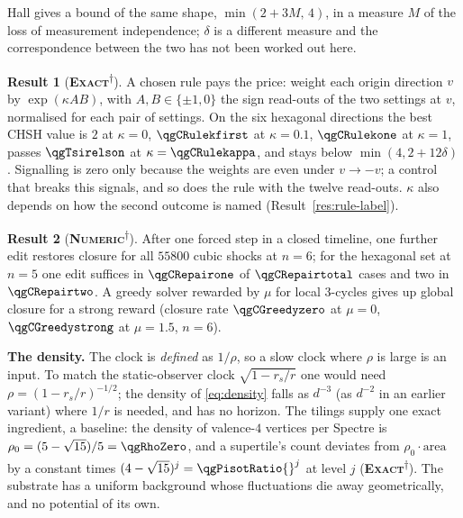 \documentclass[11pt]{article}
\newcommand{\exact}{\textbf{\textsc{Exact}}}
\newcommand{\numeric}{\textbf{\textsc{Numeric}}}
\newcommand{\snap}{\textsuperscript{$\dagger$}}      %
\theoremstyle{definition}
\newtheorem{result}{Result}
\begin{document}
Hall \cite{hall2010} gives a bound of the same shape, $\min(2+3M,\,4)$, in a measure $M$ of the loss of measurement independence; $\delta$ is a different measure and the correspondence between the two has not been worked out here.
\begin{result}[\exact\snap]\label{res:rule}
A chosen rule pays the price: weight each origin direction $v$ by $\exp(\kappa AB)$, with $A,B\in\{\pm1,0\}$ the sign read-outs of the two settings at $v$, normalised for each pair of settings. On the six hexagonal directions the best CHSH value is $2$ at $\kappa=0$, $\qgCRulekfirst$ at $\kappa=0.1$, $\qgCRulekone$ at $\kappa=1$, passes $\qgTsirelson$ at $\kappa=\qgCRulekappa$, and stays below $\min(4,2+12\delta)$. Signalling is zero only because the weights are even under $v\to-v$; a control that breaks this signals, and so does the rule with the twelve read-outs. $\kappa$ also depends on how the second outcome is named (Result~\ref{res:rule-label}).
\end{result}
\begin{result}[\numeric\snap]\label{res:repair}
After one forced step in a closed timeline, one further edit restores closure for all $55800$ cubic shocks at $n=6$; for the hexagonal set at $n=5$ one edit suffices in $\qgCRepairone$ of $\qgCRepairtotal$ cases and two in $\qgCRepairtwo$. A greedy solver rewarded by $\mu$ for local $3$-cycles gives up global closure for a strong reward (closure rate $\qgCGreedyzero$ at $\mu=0$, $\qgCGreedystrong$ at $\mu=1.5$, $n=6$).
\end{result}
\textbf{The density.}\label{sec:density}\label{sec:density-limits} The clock is \emph{defined} as $1/\rho$, so a slow clock where $\rho$ is large is an input. To match the static-observer clock $\sqrt{1-r_s/r}$ one would need $\rho=(1-r_s/r)^{-1/2}$; the density of \eqref{eq:density} falls as $d^{-3}$ (as $d^{-2}$ in an earlier variant) where $1/r$ is needed, and has no horizon. The tilings supply one exact ingredient, a baseline: the density of valence-$4$ vertices per Spectre is $\rho_0=(5-\sqrt{15})/5=\qgRhoZero$, and a supertile's count deviates from $\rho_0\cdot\mathrm{area}$ by a constant times $(4-\sqrt{15})^j=\qgPisotRatio{}^j$ at level $j$ (\exact\snap). The substrate has a uniform background whose fluctuations die away geometrically, and no potential of its own.


\end{document}
